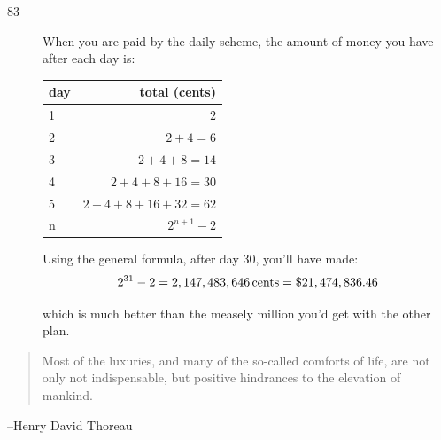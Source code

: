 \documentclass{exam}
\begin{document}
\begin{description}
      \item[83]
        When you are paid by the daily scheme, the amount of money you have after each day is:

        \begin{tabular}[H]{lr}
          \toprule
          day  & total (cents) \\
          \midrule
          1 & $2$ \\
          2 & $2 + 4 = 6$ \\
          3 & $2 + 4 + 8 = 14$ \\
          4 & $2 + 4 + 8 + 16 = 30$ \\
          5 & $2 + 4 + 8 + 16 + 32 = 62$ \\
          n & $2^{n + 1} - 2$ \\
          \bottomrule
        \end{tabular}

        Using the general formula, after day 30, you'll have made:
        \[
          2^{31} - 2 = \unit[2,147,483,646]{cents} = \$21,474,836.46
        \]

        which is much better than the measely million you'd get with the other plan.
    \end{description}

  \else
    \vspace{6 cm}
    \begin{quote}
      \begin{em}
        Most of the luxuries, and many of the so-called comforts of life, are not only not indispensable, but positive
        hindrances to the elevation of mankind.  
      \end{em}
    \end{quote}

    \hspace{1 cm} --Henry David Thoreau
  \fi
\end{document}
